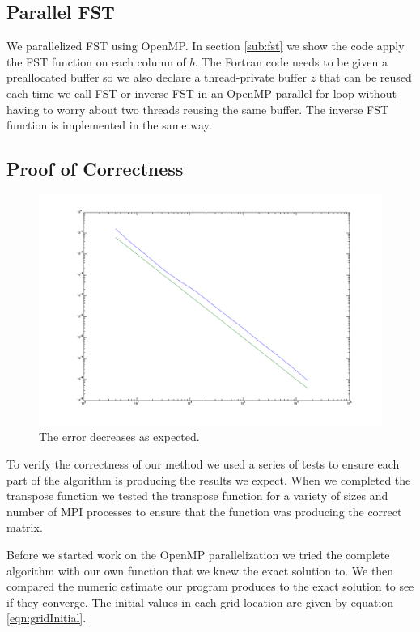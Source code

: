 \documentclass{article}
\begin{document}
\subsection{Parallel FST}
	We parallelized FST using OpenMP. In section \ref{sub:fst} we show the code apply the FST function on each column of $b$. The Fortran code needs to be given a preallocated buffer so we also declare a thread-private buffer $z$ that can be reused each time we call FST or inverse FST in an OpenMP parallel for loop without having to worry about two threads reusing the same buffer. The inverse FST function is implemented in the same way.

\subsection{Proof of Correctness}

	\begin{figure}[htbp]
	\begin{center}
	\includegraphics[width=15cm,keepaspectratio=true]{figs/errorGraph}
	\caption{The error decreases as expected.}
	\label{fig:errorGraph}
	\end{center}
	\end{figure}

	To verify the correctness of our method we used a series of tests to ensure each part of the algorithm is producing the results we expect. When we completed the transpose function we tested the transpose function for a variety of sizes and number of MPI processes to ensure that the function was producing the correct matrix. 

	Before we started work on the OpenMP parallelization we tried the complete algorithm with our own function that we knew the exact solution to. We then compared the numeric estimate our program produces to the exact solution to see if they converge. The initial values in each grid location are given by equation \ref{eqn:gridInitial}.
\end{document}
